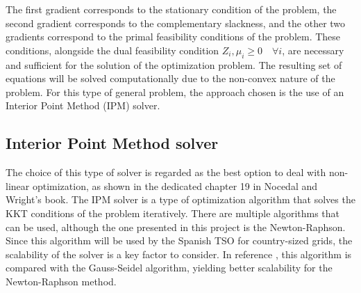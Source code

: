 The first gradient corresponds to the stationary condition of the problem, the second gradient corresponds to the complementary slackness,
and the other two gradients correspond to the primal feasibility conditions of the problem. These conditions, alongside the dual feasibility 
condition $Z_i, \mu_i \geq 0 \quad \forall i$, are necessary and sufficient for the solution of the optimization problem.
The resulting set of equations will be solved computationally due to the non-convex nature of the problem. For this type of general problem,
the approach chosen is the use of an Interior Point Method (IPM) solver.





\subsection{Interior Point Method solver}

The choice of this type of solver is regarded as the best option to deal with non-linear optimization, as shown in the dedicated chapter 19 in 
Nocedal and Wright's book. %
The IPM solver is a type of optimization algorithm that solves the KKT conditions of the problem iteratively. There are multiple algorithms that can be used,
although the one presented in this project is the Newton-Raphson. Since this algorithm will be used by the Spanish TSO for country-sized grids, the scalability of the solver 
is a key factor to consider.  In reference \cite{abaali2018comparison}, this algorithm is compared with the Gauss-Seidel algorithm, yielding better scalability 
for the Newton-Raphson method. 

